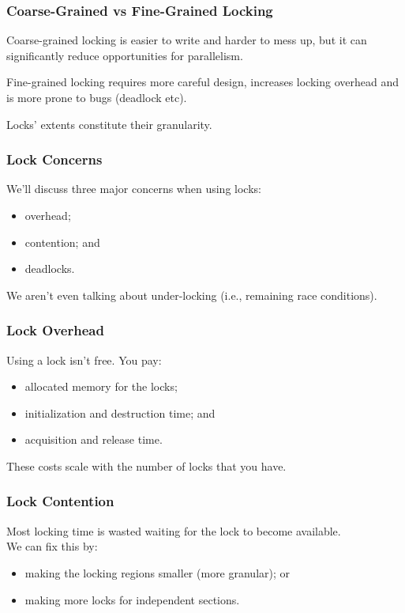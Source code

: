 \begin{frame}
\frametitle{Coarse-Grained vs Fine-Grained Locking}

\alert{Coarse-grained} locking is easier to write and harder to mess up, but it can significantly reduce opportunities for parallelism. 

\alert{Fine-grained locking} requires more careful design,
increases locking overhead and is more prone to bugs (deadlock etc).  


Locks' extents constitute their granularity. 

\end{frame}


\begin{frame}
\frametitle{Lock Concerns}

We'll discuss three major concerns when using locks:
  \begin{itemize}
    \item overhead;
    \item contention; and
    \item deadlocks.
  \end{itemize}
  
  
We aren't even talking about under-locking (i.e., remaining race conditions).

\end{frame}

\begin{frame}
\frametitle{Lock Overhead}

  Using a lock isn't free. You pay:
  \begin{itemize}
    \item allocated memory for the locks;
    \item initialization and destruction time; and
    \item acquisition and release time.
  \end{itemize}


  These costs scale with the number of locks that you have.
\end{frame}


\begin{frame}
\frametitle{Lock Contention}

\vspace*{-3em}
 Most locking time is wasted waiting for the lock to become available.\\[1em]
We can fix this by:
\vspace*{-3em}
      \begin{itemize}
        \item making the locking regions smaller (more granular); or
        \item making more locks for independent sections.
      \end{itemize}


\end{frame}

